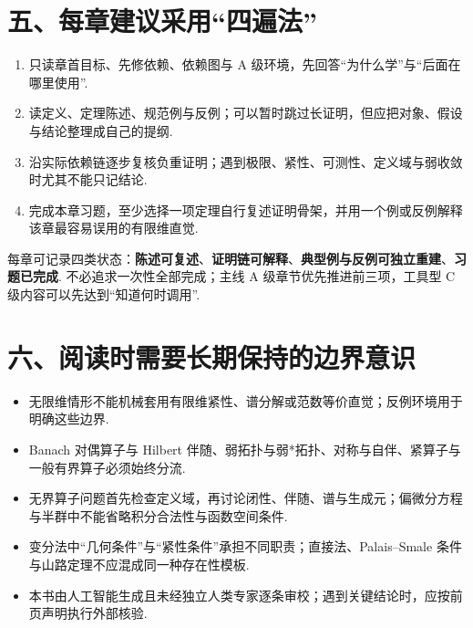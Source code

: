 \section*{五、每章建议采用“四遍法”}
\begin{enumerate}[leftmargin=2.4em,itemsep=.38em,topsep=.35em]
  \item {}只读章首目标、先修依赖、依赖图与 A 级环境，先回答“为什么学”与“后面在哪里使用”.
  \item {}读定义、定理陈述、规范例与反例；可以暂时跳过长证明，但应把对象、假设与结论整理成自己的提纲.
  \item {}沿实际依赖链逐步复核负重证明；遇到极限、紧性、可测性、定义域与弱收敛时尤其不能只记结论.
  \item {}完成本章习题，至少选择一项定理自行复述证明骨架，并用一个例或反例解释该章最容易误用的有限维直觉.
\end{enumerate}

每章可记录四类状态：\textbf{陈述可复述}、\textbf{证明链可解释}、\textbf{典型例与反例可独立重建}、\textbf{习题已完成}. 不必追求一次性全部完成；主线 A 级章节优先推进前三项，工具型 C 级内容可以先达到“知道何时调用”.

\section*{六、阅读时需要长期保持的边界意识}
\begin{itemize}[leftmargin=2.2em,itemsep=.25em,topsep=.25em]
  \item 无限维情形不能机械套用有限维紧性、谱分解或范数等价直觉；反例环境用于明确这些边界.
  \item Banach 对偶算子与 Hilbert 伴随、弱拓扑与弱*拓扑、对称与自伴、紧算子与一般有界算子必须始终分流.
  \item 无界算子问题首先检查定义域，再讨论闭性、伴随、谱与生成元；偏微分方程与半群中不能省略积分合法性与函数空间条件.
  \item 变分法中“几何条件”与“紧性条件”承担不同职责；直接法、Palais--Smale 条件与山路定理不应混成同一种存在性模板.
  \item 本书由人工智能生成且未经独立人类专家逐条审校；遇到关键结论时，应按前页声明执行外部核验.
\end{itemize}
